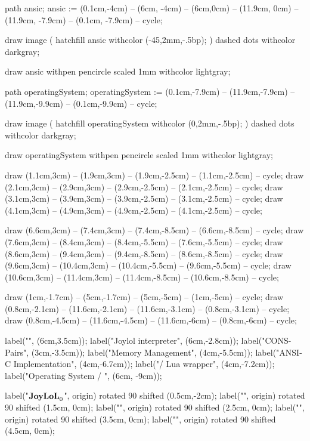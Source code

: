 path ansic;
ansic := (0.1cm,-4cm) -- (6cm, -4cm) --
     (6cm,0cm) -- (11.9cm, 0cm) -- (11.9cm, -7.9cm) -- (0.1cm, -7.9cm) -- cycle;

draw image (
  hatchfill ansic
    withcolor (-45,2mm,-.5bp);
) dashed dots withcolor darkgray;

draw ansic
  withpen pencircle scaled 1mm
  withcolor lightgray;

path operatingSystem;
operatingSystem := (0.1cm,-7.9cm) -- (11.9cm,-7.9cm) --
  (11.9cm,-9.9cm) -- (0.1cm,-9.9cm) -- cycle;
  
draw image (
  hatchfill operatingSystem
    withcolor (0,2mm,-.5bp);
) dashed dots withcolor darkgray;

draw operatingSystem
  withpen pencircle scaled 1mm
  withcolor lightgray;


draw (1.1cm,3cm) -- (1.9cm,3cm) -- (1.9cm,-2.5cm) -- (1.1cm,-2.5cm) -- cycle;
draw (2.1cm,3cm) -- (2.9cm,3cm) -- (2.9cm,-2.5cm) -- (2.1cm,-2.5cm) -- cycle;
draw (3.1cm,3cm) -- (3.9cm,3cm) -- (3.9cm,-2.5cm) -- (3.1cm,-2.5cm) -- cycle;
draw (4.1cm,3cm) -- (4.9cm,3cm) -- (4.9cm,-2.5cm) -- (4.1cm,-2.5cm) -- cycle;

draw (6.6cm,3cm) -- (7.4cm,3cm) -- (7.4cm,-8.5cm) -- (6.6cm,-8.5cm) -- cycle;
draw (7.6cm,3cm) -- (8.4cm,3cm) -- (8.4cm,-5.5cm) -- (7.6cm,-5.5cm) -- cycle;
draw (8.6cm,3cm) -- (9.4cm,3cm) -- (9.4cm,-8.5cm) -- (8.6cm,-8.5cm) -- cycle;
draw (9.6cm,3cm) -- (10.4cm,3cm) -- (10.4cm,-5.5cm) -- (9.6cm,-5.5cm) -- cycle;
draw (10.6cm,3cm) -- (11.4cm,3cm) -- (11.4cm,-8.5cm) -- (10.6cm,-8.5cm) -- cycle;

draw (1cm,-1.7cm)   -- (5cm,-1.7cm)    -- (5cm,-5cm)      -- (1cm,-5cm)     -- cycle;
draw (0.8cm,-2.1cm) -- (11.6cm,-2.1cm) -- (11.6cm,-3.1cm) -- (0.8cm,-3.1cm) -- cycle;
draw (0.8cm,-4.5cm) -- (11.6cm,-4.5cm) -- (11.6cm,-6cm)   -- (0.8cm,-6cm)   -- cycle;


label("", (6cm,3.5cm));
label("Joylol interpreter", (6cm,-2.8cm));
label("CONS-Pairs", (3cm,-3.5cm));
label("Memory Management", (4cm,-5.5cm));
label("ANSI-C Implementation", (4cm,-6.7cm));
label("/ Lua wrapper", (4cm,-7.2cm));
label("Operating System / \LuaTeX", (6cm, -9cm));

label("$\bold{JoyLoL}_0$", origin) rotated 90 shifted (0.5cm,-2cm);
label("", origin) rotated 90 shifted (1.5cm, 0cm);
label("", origin) rotated 90 shifted (2.5cm, 0cm);
label("", origin) rotated 90 shifted (3.5cm, 0cm);
label("", origin) rotated 90 shifted (4.5cm, 0cm);

